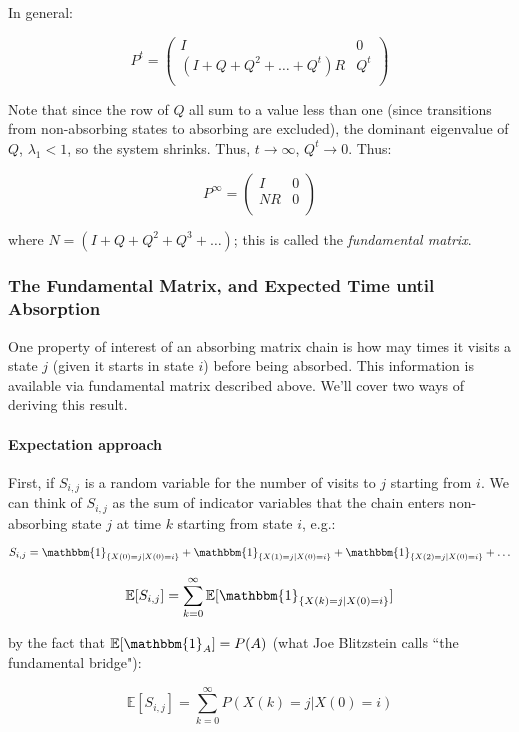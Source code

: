 \documentclass[11pt]{article}
\newcommand{\E}{\mathbb{E}}
\begin{document}
In general:

$$
P^t = \begin{pmatrix}
  I & 0 \\
  (I + Q + Q^2 + \ldots + Q^t)R & Q^t \\
\end{pmatrix}
$$

Note that since the row of $Q$ all sum to a value less than one (since
transitions from non-absorbing states to absorbing are excluded), the dominant
eigenvalue of $Q$, $\lambda_1 < 1$, so the system shrinks. Thus, $t \rightarrow
\infty$, $Q^t \rightarrow 0$. Thus:


$$
P^\infty = \begin{pmatrix}
  I & 0 \\
  NR & 0 \\
\end{pmatrix}
$$

where $N = (I + Q + Q^2 + Q^3 + \ldots)$; this is called the \emph{fundamental
matrix}.


\subsubsection{The Fundamental Matrix, and Expected Time until Absorption}

One property of interest of an absorbing matrix chain is how may times it
visits a state $j$ (given it starts in state $i$) before being absorbed. This
information is available via fundamental matrix described above. We'll cover
two ways of deriving this result.

\paragraph{Expectation approach} First, if $S_{i,j}$ is a random variable for the number of visits to $j$
starting from $i$. We can think of $S_{i,j}$ as the sum of indicator variables
that the chain enters non-absorbing state $j$ at time $k$ starting from state
$i$, e.g.:

$$
S_{i,j} = \mathbbm{1}_{\{X(0) = j | X(0) = i\}} + \mathbbm{1}_{\{X(1) = j | X(0) = i\}} + \mathbbm{1}_{\{X(2) = j | X(0) = i\}} + \ldots
$$

$$
\E[S_{i,j}] = \sum_{k=0}^\infty \E[\mathbbm{1}_{\{X(k) = j | X(0) = i\}}]
$$

by the fact that $\E[\mathbbm{1}_A] = P(A)$ (what Joe Blitzstein calls ``the
fundamental bridge"):

$$
\E[S_{i,j}] = \sum_{k=0}^\infty P(X(k) = j | X(0) = i)
$$
\end{document}
